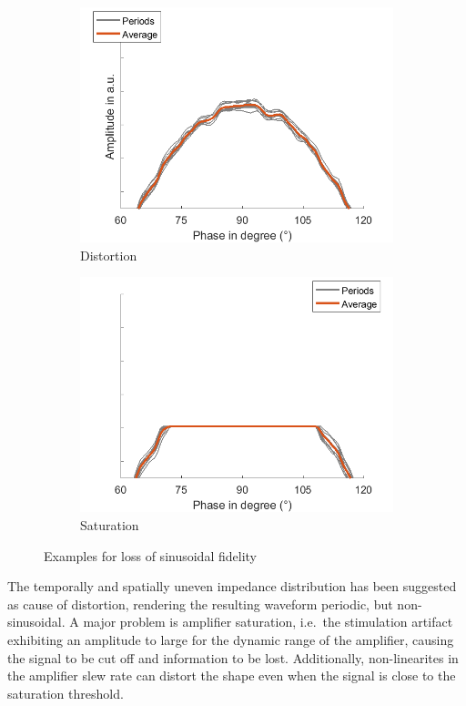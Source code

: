 \documentclass[a4paper]{article}
\begin{document}
\begin{figure}[hbtp]
    \begin{subfigure}{.5\textwidth}
    \includegraphics[width=\textwidth]{./img/intro/distortion.png}
    \caption{Distortion}\label{fig:distortion}
    \end{subfigure}
    \begin{subfigure}{.5\textwidth}
    \includegraphics[width=\textwidth]{./img/intro/saturation.png}
    \caption{Saturation}\label{fig:saturation}
    \end{subfigure}
    \caption{Examples for loss of sinusoidal fidelity}\label{fig:nonsinus}
\end{figure}

The temporally and spatially uneven impedance distribution has been suggested as cause of distortion, rendering the resulting waveform periodic, but non-sinusoidal. A major problem is amplifier saturation, i.e.\ the stimulation artifact exhibiting an amplitude to large for the dynamic range of the amplifier, causing the signal to be cut off and information to be lost.
Additionally, non-linearites in the amplifier slew rate can distort the shape even when the signal is close to the saturation threshold.
\end{document}
